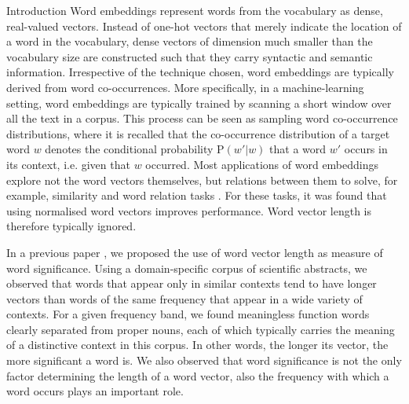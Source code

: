 \documentclass{article} %
\newcommand{\p}{\mathrm{P}}
\begin{document}
\begin{section}{Introduction}
Word embeddings represent words from the vocabulary as dense, real-valued
vectors.  Instead of one-hot vectors that merely indicate the location
of a word in the vocabulary, dense
vectors of dimension much smaller than the vocabulary size are
constructed such that they carry syntactic and semantic information.
Irrespective of the technique chosen, word embeddings are
typically derived from word co-occurrences.  More specifically, in a
machine-learning setting, word embeddings are typically trained by
scanning a short window over all the text in a corpus.  This process can
be seen as sampling word co-occurrence distributions, where it is
recalled that the co-occurrence distribution of a target word $w$
denotes the conditional probability $\p(w'|w)$ that a word $w'$ occurs in
its context, i.e. given that $w$ occurred.  Most applications of word
embeddings explore not the word vectors themselves, but relations
between them to solve, for example, similarity and word relation tasks
\cite{vecchi-baroni-zamparelli2011}.  For these tasks, it was found that using normalised word
vectors improves performance.  Word vector length is therefore typically
ignored.

In a previous paper \cite{schakel-wilson}, we proposed the use of word
vector length as measure of word significance.  Using a domain-specific
corpus of scientific abstracts, we observed that words that appear only
in similar contexts tend to have longer vectors than words of the same
frequency that appear in a wide variety of contexts.  For a given
frequency band, we found meaningless function words clearly separated
from proper nouns, each of which typically carries the meaning of a
distinctive context in this corpus.  In other words, the longer its
vector, the more significant a word is.  We also observed that word
significance is not the only factor determining the length of a word
vector, also the frequency with which a word occurs plays an important
role.


\end{section}
\end{document}
